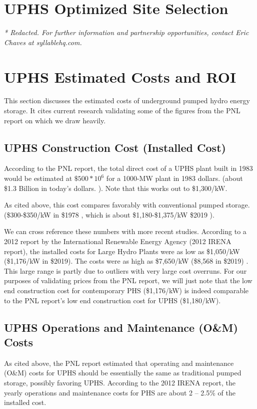 \documentclass[hidelinks,12pt,a4paper]{article}
\begin{document}
\pagebreak[1]
\section{UPHS Optimized Site Selection}

\textit{* Redacted. For further information and partnership opportunities, contact Eric Chaves at syllablehq.com.}


\pagebreak[1]
\section{UPHS Estimated Costs and ROI}
This section discusses the estimated costs of underground pumped hydro energy storage. It cites current research validating some of the figures from the PNL report on which we draw heavily.

\subsection{UPHS Construction Cost (Installed Cost)}

According to the PNL report, the total direct cost of a UPHS plant built in 1983 would be estimated at $\$500 * 10^6$ for a 1000-MW plant in 1983 dollars.\cite{UndergroundPumpedHydroelectricStorage} (about \$1.3 Billion in today's dollars. \cite{CPIInflationCalculator}). Note that this works out to \$1,300/kW.

As cited above, this cost compares favorably with conventional pumped storage. (\$300-\$350/kW in \$1978 \cite{UndergroundPumpedHydroelectricStorage}, which is about \$1,180-\$1,375/kW \$2019 \cite{CPIInflationCalculator}).

We can cross reference these numbers with more recent studies. According to a 2012 report by the International Renewable Energy Agency (2012 IRENA report), the installed costs for Large Hydro Plants were as low as \$1,050/kW (\$1,176/kW in \$2019). The costs were as high as \$7,650/kW (\$8,568 in \$2019) \cite{RenewableEnergyTechnologiesCostAnalysisSeries}. This large range is partly due to outliers with very large cost overruns. For our purposes of validating prices from the PNL report, we will just note that the low end construction cost for contemporary PHS (\$1,176/kW) is indeed comparable to the PNL report's low end construction cost for UPHS (\$1,180/kW).

\subsection{UPHS Operations and Maintenance (O\&M) Costs}
As cited above, the PNL report estimated that operating and maintenance (O\&M) costs for UPHS should be essentially the same as traditional pumped storage, possibly favoring UPHS. \cite{UndergroundPumpedHydroelectricStorage} According to the 2012 IRENA report, the yearly operations and maintenance costs for PHS are about 2 – 2.5\% of the installed cost.
\end{document}
